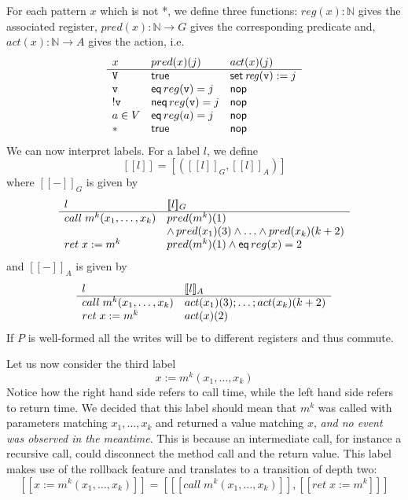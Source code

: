 \documentclass{article} %
\newcommand{\N}{\ensuremath{\mathbb{N}}}
\theoremstyle{definition}
\theoremstyle{remark}
\begin{document}
For each pattern $x$ which is not *, we define three functions:
$reg(x) : \N$ gives the associated register, $pred(x) : \N\to G$ gives
the corresponding predicate and, $act(x) : \N\to A$ gives the action, i.e.
\[
\begin{array}{l l l}
  x & pred(x)(j) & act(x)(j) \\
  \hline
  \mathtt{V} & {\sf true} & {\sf set}\,{\it reg}({\tt v}):=j \\
  \mathtt{v} & {\sf eq}\,reg(\mathtt{v})=j & {\sf nop} \\
  \mathtt{!v} & {\sf neq}\,reg(\mathtt{v})=j  & {\sf nop}  \\
  a\in V & {\sf eq}\,reg(a)=j  & {\sf nop}  \\
  * & {\sf true} & {\sf nop}  \\
\end{array}
\]
We can now interpret labels.
\newcommand{\den}[1]{[\![#1]\!]}
\newcommand{\denG}[1]{\den{#1}_G}
\newcommand{\denA}[1]{\den{#1}_A}
For a label $l$, we define
\[
\den{l} = [(\denG{l}, \denA{l})]
\]
where $\denG-$ is given by
\[
\begin{array}{l l}
  l & \denG l \\
  \hline
  call\;m^k(x_1, \ldots, x_k) & pred(m^k)(1) \\
                                           & \land\,pred(x_1)(3) \land\ldots\land pred(x_k)(k+2) \\
  ret\;x := m^k & pred(m^k)(1) \land {\sf eq}\,reg(x) = 2 \\
\end{array}
\]
and $\denA-$ is given by
\[
\begin{array}{l l l}
  l & \denA l \\
  \hline
  call\;m^k(x_1, \ldots, x_k) & act(x_1)(3); \dots; act(x_k)(k+2) \\
  ret\;x := m^k & act(x)(2) \\
\end{array}
\]
If $P$ is well-formed all the writes will be to different registers
and thus commute.

Let us now consider the third label
\[
x := m^k(x_1, \ldots, x_k)
\]
Notice how the right hand side refers to call time, while the left
hand side refers to return time. We decided that this label should
mean that $m^k$ was called with parameters matching $x_1, \ldots, x_k$
and returned a value matching $x$, \emph{and no event was observed in
  the meantime}. This is because an intermediate call, for instance a
recursive call, could disconnect the method call and the return value.
This label makes use of the rollback feature and translates to a
transition of depth two:
\[
\den{x := m^k(x_1, \ldots, x_k)}
=
[\den{call\;m^k(x_1, \ldots, x_k)}, \den{ret\;x := m^k}]
\]
\end{document}
